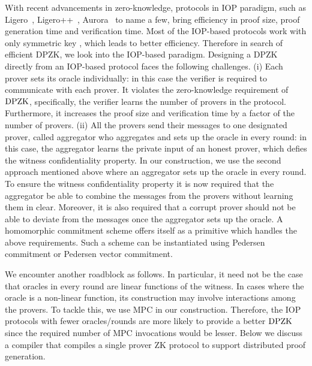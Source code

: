 With recent advancements in zero-knowledge, protocols in IOP paradigm, such as Ligero~\cite{ligero}, Ligero++~\cite{ligero++}, Aurora~\cite{aurora} to name a few, bring efficiency in proof size, proof generation time and verification time. Most of the IOP-based protocols work with only symmetric key , which leads to better efficiency. Therefore in search of efficient DPZK, we look into the IOP-based paradigm. Designing a DPZK directly from an IOP-based protocol faces the following challenges. (i) Each prover sets its oracle individually: in this case the verifier is required to communicate with each prover. It violates the zero-knowledge requirement of $\text{DPZK}$, specifically, the verifier learns the number of provers in the protocol. Furthermore, it increases the proof size and verification time by a factor of the number of provers. (ii) All the provers send their messages to one designated prover, called aggregator who aggregates and sets up the oracle in every round: in this case, the aggregator learns the private input of an honest prover, which defies the witness confidentiality property. 
In our construction, we use the second approach mentioned above where an aggregator sets up the oracle in every round. To ensure the witness confidentiality property it is now required that the aggregator be able to combine the messages from the provers without learning them in clear. Moreover, it is also required that a corrupt prover should not be able to deviate from the messages once the aggregator sets up the oracle. A homomorphic commitment scheme offers itself as a primitive which handles the above requirements. Such a scheme can be instantiated using Pedersen commitment or Pedersen vector commitment.

We encounter another roadblock as follows. In particular, it need not be the case that oracles in every round are linear functions of the witness. In cases where the oracle is a non-linear function, its construction may involve interactions among the provers. To tackle this, we use MPC in our construction. Therefore, the IOP protocols with fewer oracles/rounds are more likely to provide a better $\text{DPZK}$ since the required number of MPC invocations would be lesser. Below we discuss a compiler that compiles a
single prover ZK protocol to support distributed proof generation.  

